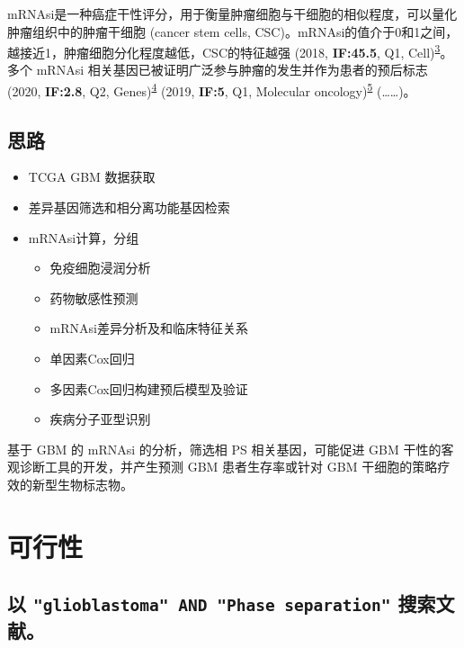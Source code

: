 \documentclass[
]{article}
\providecommand{\tightlist}{%
  \setlength{\itemsep}{0pt}\setlength{\parskip}{0pt}}
\begin{document}
mRNAsi是一种癌症干性评分，用于衡量肿瘤细胞与干细胞的相似程度，可以量化肿瘤组织中的肿瘤干细胞 (cancer stem cells, CSC)。mRNAsi的值介于0和1之间，越接近1，肿瘤细胞分化程度越低，CSC的特征越强 (2018, \textbf{IF:45.5}, Q1, Cell)\textsuperscript{\protect\hyperlink{ref-Machine_Learnin_Malta_2018}{3}}。多个 mRNAsi 相关基因已被证明广泛参与肿瘤的发生并作为患者的预后标志 (2020, \textbf{IF:2.8}, Q2, Genes)\textsuperscript{\protect\hyperlink{ref-mRNAsi_Index_M_Zhang_2020}{4}} (2019, \textbf{IF:5}, Q1, Molecular oncology)\textsuperscript{\protect\hyperlink{ref-Integrative_ana_Lian_2019}{5}} (\ldots\ldots)。

\hypertarget{introduction}{%
\subsection{思路}\label{introduction}}

\begin{itemize}
\tightlist
\item
  TCGA GBM 数据获取
\item
  差异基因筛选和相分离功能基因检索
\item
  mRNAsi计算，分组

  \begin{itemize}
  \tightlist
  \item
    免疫细胞浸润分析
  \item
    药物敏感性预测
  \item
    mRNAsi差异分析及和临床特征关系
  \item
    单因素Cox回归
  \item
    多因素Cox回归构建预后模型及验证
  \item
    疾病分子亚型识别
  \end{itemize}
\end{itemize}

基于 GBM 的 mRNAsi 的分析，筛选相 PS 相关基因，可能促进 GBM 干性的客观诊断工具的开发，并产生预测 GBM 患者生存率或针对 GBM 干细胞的策略疗效的新型生物标志物。

\hypertarget{methods}{%
\section{可行性}\label{methods}}

\hypertarget{ux4ee5-glioblastoma-and-phase-separation-ux641cux7d22ux6587ux732e}{%
\subsection{\texorpdfstring{以 \texttt{"glioblastoma"\ AND\ "Phase\ separation"} 搜索文献。}{以 "glioblastoma" AND "Phase separation" 搜索文献。}}\label{ux4ee5-glioblastoma-and-phase-separation-ux641cux7d22ux6587ux732e}}
\end{document}
